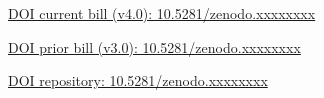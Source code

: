 \documentclass[11pt]{article}
\begin{document}
\href{https://doi.org/10.5281/zenodo.xxxxxxxx}{DOI current bill (v4.0): 10.5281/zenodo.xxxxxxxx}

\href{https://doi.org/10.5281/zenodo.xxxxxxxx}{DOI prior bill (v3.0): 10.5281/zenodo.xxxxxxxx}

\href{https://doi.org/10.5281/zenodo.xxxxxxxx}{DOI repository: 10.5281/zenodo.xxxxxxxx}


\clearpage
{}
{}
\vspace{-0.4cm}

\begingroup
\RaggedRight
\nocite{*}


\endgroup
\end{document}
